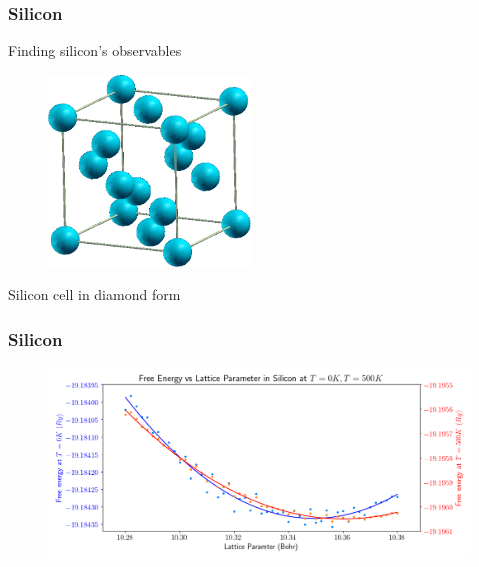\documentclass{beamer}
\begin{document}
\begin{frame}
\frametitle{Silicon}
\begin{center}Finding silicon's observables\end{center}
	\begin{figure}[ht]
	\begin{center}
	\includegraphics[height=2in]{sidiamond.png}
	\end{center}
	\end{figure}
\begin{center}
Silicon cell in diamond form
\end{center}
\end{frame}
 
\begin{frame}
	\frametitle{Silicon}
	\begin{figure}[ht]
	\begin{center}
	\includegraphics[height=2in]{silicon_0_500_comparison.png}
	\end{center}
	\end{figure}
\end{frame}
\end{document}
